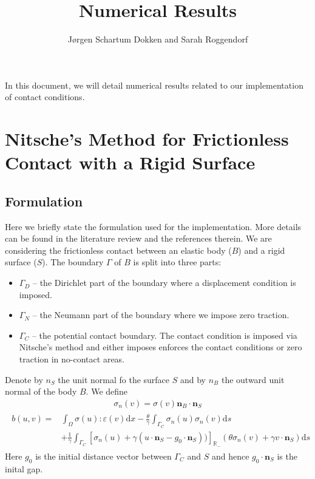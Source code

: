 \documentclass[12pt]{article}
\title{Numerical Results}
\author{J\o rgen Schartum Dokken and Sarah Roggendorf}
\affil{Department of Engineering, University of Cambridge}
\newcommand{\mbf}[1]{\mathbf{#1}}
\newcommand{\mrm}[1]{\mathrm{#1}}
\newcommand{\mbb}[1]{\mathbb{#1}}
\newcommand{\md}{\mrm{d}}
\begin{document}
\maketitle
\linenumbers
In this document, we will detail numerical results related to our implementation of contact conditions.
\section{Nitsche's Method for Frictionless Contact with a Rigid Surface}
\subsection{Formulation}
Here we briefly state the formulation used for the implementation. More details can be found in the literature review and the references therein.
We are considering the frictionless contact between an elastic body ($B$) and a rigid surface ($S$). The boundary $\Gamma$ of $B$ is split into three parts:
\begin{itemize}
    \item $\Gamma_D$ -- the Dirichlet part of the boundary where a displacement condition is imposed.
    \item $\Gamma_N$ -- the Neumann part of the boundary where we impose zero traction.
    \item $\Gamma_C$ -- the potential contact boundary. The contact condition is imposed via Nitsche's method and either imposes 
enforces the contact conditions or zero traction in no-contact areas.
\end{itemize}
Denote by $n_S$ the unit normal fo the surface $S$ and by $n_B$ the outward unit normal of the body $B$. We define 
\begin{align}
    \sigma_n(v) = \sigma (v) \mbf{n}_B \cdot \mbf{n}_S
\end{align}
\begin{align}
    \begin{split}
    b(u,v) = &\int_{\Omega} \sigma(u): \varepsilon(v) \md x- \frac{\theta}{\gamma} \int_{\Gamma_C} \sigma_n(u)\sigma_n(v) \md s\\
     &+ \frac{1}{\gamma} \int_{\Gamma_C} \left[\sigma_n(u) + \gamma(u \cdot \mbf{n}_S - g_0 \cdot  \mbf{n}_S)) \right]_{\mbb{R}_-}(\theta \sigma_n(v) + \gamma v \cdot \mbf{n}_{S})\md s
    \end{split}
\end{align}
Here $g_0$ is the initial distance vector between $\Gamma_C$ and $S$ and hence $g_0 \cdot \mbf{n}_S$ is the inital gap.
\end{document}
